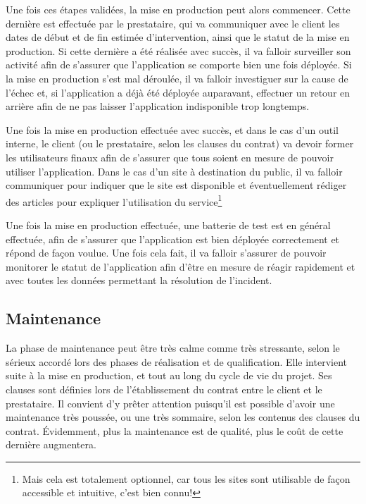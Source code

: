 Une fois ces étapes validées, la mise en production peut alors commencer. Cette dernière est effectuée par le prestataire, qui va communiquer avec le client les dates de début et de fin estimée d'intervention, ainsi que le statut de la mise en production. Si cette dernière a été réalisée avec succès, il va falloir surveiller son activité afin de s'assurer que l'application se comporte bien une fois déployée. Si la mise en production s'est mal déroulée, il va falloir investiguer sur la cause de l'échec et, si l'application a déjà été déployée auparavant, effectuer un retour en arrière afin de ne pas laisser l'application indisponible trop longtemps. 

Une fois la mise en production effectuée avec succès, et dans le cas d'un outil interne, le client (ou le prestataire, selon les clauses du contrat) va devoir former les utilisateurs finaux afin de s'assurer que tous soient en mesure de pouvoir utiliser l'application. Dans le cas d'un site à destination du public, il va falloir communiquer pour indiquer que le site est disponible et éventuellement rédiger des articles pour expliquer l'utilisation du service\footnote{Mais cela est totalement optionnel, car tous les sites sont utilisable de façon accessible et intuitive, c'est bien connu!}

Une fois la mise en production effectuée, une batterie de test est en général effectuée, afin de s'assurer que l'application est bien déployée correctement et répond de façon voulue. Une fois cela fait, il va falloir s'assurer de pouvoir monitorer le statut de l'application afin d'être en mesure de réagir rapidement et avec toutes les données permettant la résolution de l'incident.

\subsection{Maintenance}

La phase de maintenance peut être très calme comme très stressante, selon le sérieux accordé lors des phases de réalisation et de qualification. Elle intervient suite à la mise en production, et tout au long du cycle de vie du projet. Ses clauses sont définies lors de l'établissement du contrat entre le client et le prestataire. Il convient d'y prêter attention puisqu'il est possible d'avoir une maintenance très poussée, ou une très sommaire, selon les contenus des clauses du contrat. Évidemment, plus la maintenance est de qualité, plus le coût de cette dernière augmentera.

